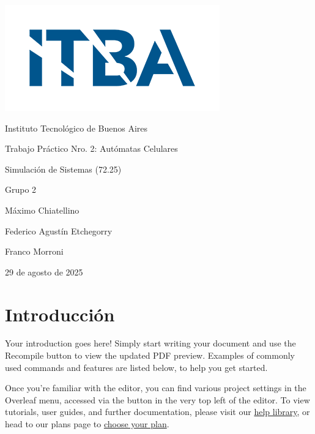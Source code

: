 \documentclass{article}
\begin{document}
\begin{titlepage}
    \centering
    \vspace*{1cm}
    \includegraphics[width=0.4\linewidth]{logo-itba-site.png}
    \vspace{1.5cm}

    {\Large Instituto Tecnológico de Buenos Aires \par}
    \vspace{1.5cm}

    {\Huge Trabajo Práctico Nro. 2: Autómatas Celulares \par}
    \vspace{1cm}

    {\LARGE Simulación de Sistemas (72.25)\par}
    \vspace{1.5cm}

    {\large Grupo 2 \par}
    \vspace{0.8cm}

    {\large Máximo Chiatellino \par
    Federico Agustín Etchegorry \par
    Franco Morroni \par}
    \vfill

    {\large 29 de agosto de 2025 \par}
\end{titlepage}


\clearpage
\tableofcontents
\clearpage


\section{Introducción}

Your introduction goes here! Simply start writing your document and use the Recompile button to view the updated PDF preview. Examples of commonly used commands and features are listed below, to help you get started.

Once you're familiar with the editor, you can find various project settings in the Overleaf menu, accessed via the button in the very top left of the editor. To view tutorials, user guides, and further documentation, please visit our \href{https://www.overleaf.com/learn}{help library}, or head to our plans page to \href{https://www.overleaf.com/user/subscription/plans}{choose your plan}.
\end{document}

